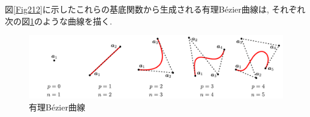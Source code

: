 \documentclass{jsarticle}
\theoremstyle{definition}%
\begin{document}
\noindent
図\ref{Fig212}に示したこれらの基底関数から生成される有理B\'ezier曲線は, それぞれ次の図\ref{Fig213}のような曲線を描く.
\addtocounter{footnote}{-1}
\begin{figure}[htbp]
	\centering
    \includegraphics[page=7,clip,width=130mm]{fig.pdf}
	\caption{有理B\'ezier曲線 \protect\footnotemark}
	\label{Fig213}
\end{figure}


\clearpage
\end{document}
